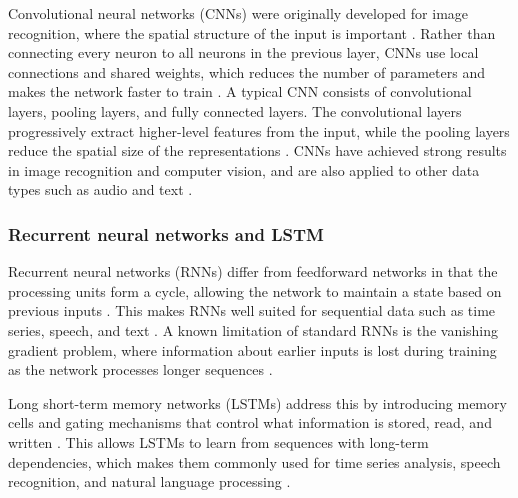 Convolutional neural networks (CNNs) were originally developed 
for image recognition, where the spatial structure of the input 
is important \parencite{lecun2015deep_learning, lecun1998cnn}. 
Rather than connecting every neuron to all neurons in the previous layer, 
CNNs use local connections and shared weights, which reduces the number of 
parameters and makes the network faster to train 
\parencite{shrestha2019review_deep_learning_algorithms_architectures}. 
A typical CNN consists of convolutional layers, pooling layers, and fully 
connected layers. The convolutional layers progressively extract higher-level 
features from the input, while the pooling layers reduce the spatial size of 
the representations 
\parencite{pouyanfar2018survey_deep_learning_algorithms, 
sarker2021machine_learning_algorithms_real_world_applications_research_directions}. 
CNNs have achieved strong results in image recognition and computer vision, 
and are also applied to other data types such as audio and text 
\parencite{lecun2015deep_learning, pouyanfar2018survey_deep_learning_algorithms}.

\subsubsection*{Recurrent neural networks and LSTM}

Recurrent neural networks (RNNs) differ from feedforward networks in that 
the processing units form a cycle, allowing the network to maintain a state 
based on previous inputs 
\parencite{shrestha2019review_deep_learning_algorithms_architectures}. 
This makes RNNs well suited for sequential data such as time series, speech, 
and text 
\parencite{lecun2015deep_learning, pouyanfar2018survey_deep_learning_algorithms}. 
A known limitation of standard RNNs is the vanishing gradient problem, 
where information about earlier inputs is lost during training as the network 
processes longer sequences 
\parencite{pouyanfar2018survey_deep_learning_algorithms, 
shrestha2019review_deep_learning_algorithms_architectures}.

Long short-term memory networks (LSTMs) address this by introducing memory 
cells and gating mechanisms that control what information is stored, read, 
and written 
\parencite{hochreiter1997lstm, 
shrestha2019review_deep_learning_algorithms_architectures}. 
This allows LSTMs to learn from sequences with long-term dependencies, 
which makes them commonly used for time series analysis, speech recognition, 
and natural language processing 
\parencite{lecun2015deep_learning, 
sarker2021machine_learning_algorithms_real_world_applications_research_directions}.

